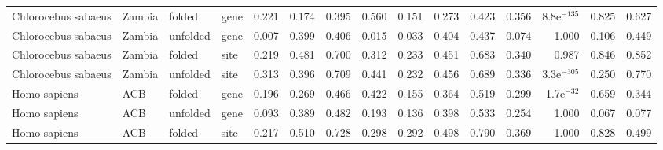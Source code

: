 \begin{longtable}{llllrrrrrrrrrrr}
 Chlorocebus sabaeus &                    Zambia &    folded &  gene &                              0.221 &                               0.174 &                 0.395 &                 0.560 &                              0.151 &                               0.273 &                 0.423 &                 0.356 & 8.8e$^{-135}$ &  0.825 &  0.627 \\
 Chlorocebus sabaeus &                    Zambia &  unfolded &  gene &                              0.007 &                               0.399 &                 0.406 &                 0.015 &                              0.033 &                               0.404 &                 0.437 &                 0.074 &         1.000 &  0.106 &  0.449 \\
 Chlorocebus sabaeus &                    Zambia &    folded &  site &                              0.219 &                               0.481 &                 0.700 &                 0.312 &                              0.233 &                               0.451 &                 0.683 &                 0.340 &         0.987 &  0.846 &  0.852 \\
 Chlorocebus sabaeus &                    Zambia &  unfolded &  site &                              0.313 &                               0.396 &                 0.709 &                 0.441 &                              0.232 &                               0.456 &                 0.689 &                 0.336 & 3.3e$^{-305}$ &  0.250 &  0.770 \\
        Homo sapiens &                       ACB &    folded &  gene &                              0.196 &                               0.269 &                 0.466 &                 0.422 &                              0.155 &                               0.364 &                 0.519 &                 0.299 &  1.7e$^{-32}$ &  0.659 &  0.344 \\
        Homo sapiens &                       ACB &  unfolded &  gene &                              0.093 &                               0.389 &                 0.482 &                 0.193 &                              0.136 &                               0.398 &                 0.533 &                 0.254 &         1.000 &  0.067 &  0.077 \\
        Homo sapiens &                       ACB &    folded &  site &                              0.217 &                               0.510 &                 0.728 &                 0.298 &                              0.292 &                               0.498 &                 0.790 &                 0.369 &         1.000 &  0.828 &  0.499 \\

\end{longtable}
